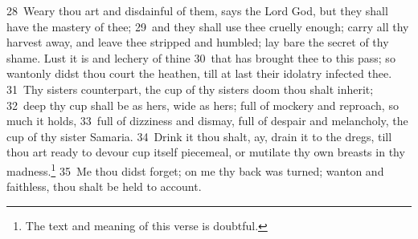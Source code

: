 \documentclass[10pt]{book} %
\begin{document}
\textcolor{benred8}{28}~Weary thou art and disdainful of them, says the Lord God, but they shall have the mastery of thee; \textcolor{benred8}{29}~and they shall use thee cruelly enough; carry all thy harvest away, and leave thee stripped and humbled; lay bare the secret of thy shame. Lust it is and lechery of thine \textcolor{benred8}{30}~that has brought thee to this pass; so wantonly didst thou court the heathen, till at last their idolatry infected thee. \textcolor{benred8}{31}~Thy sister\textquotesingle s counterpart, the cup of thy sister\textquotesingle s doom thou shalt inherit; \textcolor{benred8}{32}~deep thy cup shall be as hers, wide as hers; full of mockery and reproach, so much it holds, \textcolor{benred8}{33}~full of dizziness and dismay, full of despair and melancholy, the cup of thy sister Samaria. \textcolor{benred8}{34}~Drink it thou shalt, ay, drain it to the dregs, till thou art ready to devour cup itself piecemeal, or mutilate thy own breasts in thy madness.\footnote[1]{The text and meaning of this verse is doubtful.} \textcolor{benred8}{35}~Me thou didst forget; on me thy back was turned; wanton and faithless, thou shalt be held to account.
\end{document}
